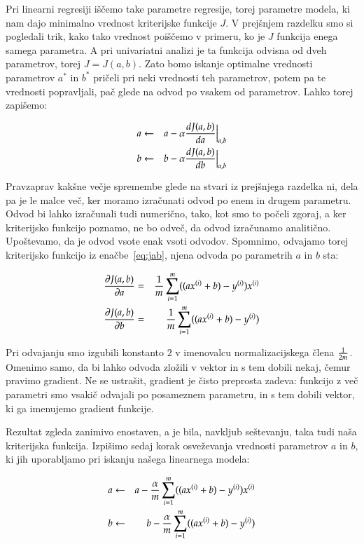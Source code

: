 Pri linearni regresiji iščemo take parametre regresije, torej
parametre modela, ki nam dajo minimalno vrednost kriterijske funkcije
$J$. V prejšnjem razdelku smo si pogledali trik, kako tako vrednost
poiščemo v primeru, ko je $J$ funkcija enega samega parametra. A pri
univariatni analizi je ta funkcija odvisna od dveh parametrov, torej
$J=J(a,b)$. Zato bomo iskanje optimalne vrednosti parametrov $a^*$ in
$b^*$ pričeli pri neki vrednosti teh parametrov, potem pa te vrednosti
popravljali, pač glede na odvod po vsakem od parametrov. Lahko torej
zapišemo:

\begin{eqnarray}
a & \leftarrow & a - \alpha {dJ(a,b)\over da}\Bigr|_{a,b} \\
b & \leftarrow & b - \alpha {dJ(a,b)\over db}\Bigr|_{a,b}
\end{eqnarray}

Pravzaprav kakšne večje spremembe glede na stvari iz prejšnjega
razdelka ni, dela pa je le malce več, ker moramo izračunati odvod po
enem in drugem parametru. Odvod bi lahko izračunali tudi numerično,
tako, kot smo to počeli zgoraj, a ker kriterijsko funkcijo poznamo, ne
bo odveč, da odvod izračunamo analitično. Upoštevamo, da je odvod
vsote enak vsoti odvodov. Spomnimo, odvajamo torej kriterijsko
funkcijo iz enačbe~\ref{eq:jab}, njena odvoda po parametrih $a$ in $b$ sta:

\begin{eqnarray}
  {\partial J(a,b)\over\partial a} &=& {1\over m}\sum_{i=1}^m((a x^{(i)} + b)-y^{(i)})x^{(i)} \\
  {\partial J(a,b)\over\partial b} &=& {1\over m}\sum_{i=1}^m((a x^{(i)} + b)-y^{(i)})
\end{eqnarray}

Pri odvajanju smo izgubili konstanto $2$ v imenovalcu
normalizacijskega člena $1\over 2m$. Omenimo samo, da bi lahko odvoda
zložili v vektor in s tem dobili nekaj, čemur pravimo gradient. Ne se
ustrašit, gradient je čisto preprosta zadeva: funkcijo z več parametri
smo vsakič odvajali po posameznem parametru, in s tem dobili vektor,
ki ga imenujemo gradient funkcije.

Rezultat zgleda zanimivo enostaven, a je bila, navkljub seštevanju,
taka tudi naša kriterijska funkcija. Izpišimo sedaj korak osveževanja
vrednosti parametrov $a$ in $b$, ki jih uporabljamo pri iskanju našega
linearnega modela:

\begin{eqnarray}
a & \leftarrow & a - {\alpha\over m}\sum_{i=1}^m((a x^{(i)} + b)-y^{(i)})x^{(i)} \\
b & \leftarrow & b - {\alpha\over m}\sum_{i=1}^m((a x^{(i)} + b)-y^{(i)})
\end{eqnarray}

